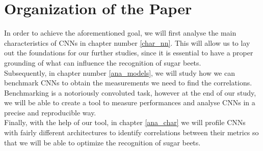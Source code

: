 \section{Organization of the Paper}
In order to achieve the aforementioned goal, we will first analyse the main characteristics of CNNs in chapter number \ref{char_nn}. This will allow us to lay out the foundations for our further studies, since it is essential to have a proper grounding of what can influence the recognition of sugar beets.\\
Subsequently, in chapter number \ref{ana_models}, we will study how we can benchmark CNNs to obtain the measurements we need to find the correlations. Benchmarking is a notoriously convoluted task, however at the end of our study, we will be able to create a tool to measure performances and analyse CNNs in a precise and reproducible way.\\
Finally, with the help of our tool, in chapter \ref{ana_char} we will profile CNNs with fairly different architectures to identify correlations between their metrics so that we will be able to optimize the recognition of sugar beets. 
